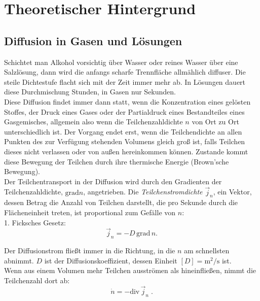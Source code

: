 \section{Theoretischer Hintergrund}

\subsection{Diffusion in Gasen und Lösungen}

Schichtet man Alkohol vorsichtig über Wasser oder reines Wasser über eine Salzlösung, dann wird die anfangs scharfe Trennfläche allmählich diffuser. Die steile Dichtestufe flacht sich mit der Zeit immer mehr ab. In Lösungen dauert diese Durchmischung Stunden, in Gasen nur Sekunden.\\
Diese Diffusion findet immer dann statt, wenn die Konzentration eines gelösten Stoffes, der Druck eines Gases oder der Partialdruck eines Bestandteiles eines Gasgemisches, allgemein also wenn die Teilchenzahldichte $n$ von Ort zu Ort unterschiedlich ist. Der Vorgang endet erst, wenn die Teilchendichte an allen Punkten des zur Verfügung stehenden Volumens gleich groß ist, falls Teilchen dieses nicht verlassen oder von außen hereinkommen können. Zustande kommt diese Bewegung der Teilchen durch ihre thermische Energie (Brown'sche Bewegung).\\
Der Teilchentransport in der Diffusion wird durch den Gradienten der Teilchenzahldichte, $\mathrm{grad} n$, angetrieben. Die \textit{Teilchenstromdichte} $\vec{j}_n$, ein Vektor, dessen Betrag die Anzahl von Teilchen darstellt, die pro Sekunde durch die Flächeneinheit treten, ist proportional zum Gefälle von $n$:\\

1. Ficksches Gesetz:
\begin{equation}
 \vec{j}_n = -D\,\mathrm{grad}\, n.
 \label{eq:Fick1}
\end{equation}

Der Diffusionstrom fließt immer in die Richtung, in die $n$ am schnellsten abnimmt. $D$ ist der Diffusionskoeffizient, dessen Einheit $\left[D\right] = \mathrm{m^2/s}$ ist.\\

Wenn aus einem Volumen mehr Teilchen ausströmen als hineinfließen, nimmt die Teilchenzahl dort ab:
\begin{equation}
 \dot{n} = -\mathrm{div}\,\vec{j}_n\; .
\end{equation}

